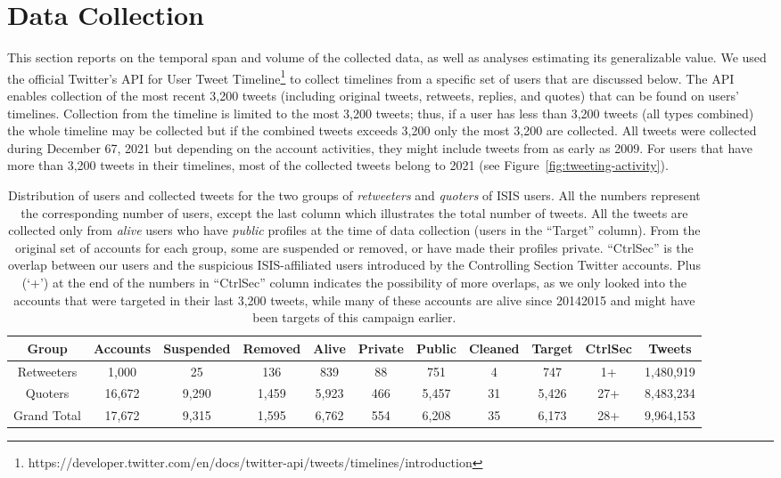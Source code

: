 \documentclass[letterpaper]{article}
\begin{document}
\section{Data Collection}

This section reports on the temporal span and volume of the collected data, as well as analyses estimating its generalizable value.
We used the official Twitter's API for User Tweet Timeline\footnote{https://developer.twitter.com/en/docs/twitter-api/tweets/timelines/introduction} to collect timelines from a specific set of users that are discussed below. The API enables collection of the most recent 3,200 tweets (including original tweets, retweets, replies, and quotes) that can be found on users' timelines. Collection from the timeline is limited to the most 3,200 tweets; thus, if a user has less than 3,200 tweets (all types combined) the whole timeline may be collected but if the combined tweets exceeds 3,200 only the most 3,200 are collected.  All tweets were collected during December 67, 2021 but depending on the account activities, they might include tweets from as early as 2009. For   users that have  more than 3,200 tweets in their timelines, most of the collected tweets  belong to 2021 (see   Figure~\ref{fig:tweeting-activity}).





\begin{table}[ht]
\centering
\begin{tabular}{|c||c|c|c|c|c|c|c|c|c|c|}
 \hline
 Group & Accounts & Suspended & Removed & Alive & Private & Public & Cleaned & Target & CtrlSec & Tweets\\ [0.5ex]
 \hline\hline
  Retweeters & 1,000 & 25 & 136 & 839 & 88 & 751 & 4 & 747 & 1+ & 1,480,919 \\\hline
 Quoters & 16,672 & 9,290 & 1,459 & 5,923 & 466 & 5,457 & 31 & 5,426 & 27+ & 8,483,234\\[0.25ex]\hline
Grand Total & 17,672 & 9,315 & 1,595 & 6,762 & 554 & 6,208 & 35 & 6,173 & 28+ & 9,964,153 \\[0.25ex]\hline
\end{tabular}
\caption{Distribution of users and collected tweets for the two groups of \textit{retweeters} and \textit{quoters} of ISIS users. All the numbers represent the corresponding number of users, except the last column which illustrates the total number of tweets. All the tweets are collected only from \textit{alive} users who have \textit{public} profiles at the time of data collection (users in the ``Target'' column). From the original set of accounts for each group, some are suspended or removed, or have made their profiles private. ``CtrlSec'' is the overlap between our users and the suspicious ISIS-affiliated users introduced by the Controlling Section Twitter accounts. Plus (`+') at the end of the numbers in ``CtrlSec'' column indicates the possibility of more overlaps, as we only looked into the accounts that were targeted in their last 3,200 tweets, while many of these accounts are alive since 20142015 and might have been targets of this campaign earlier.}
\label{table:users}
\end{table}
\end{document}
